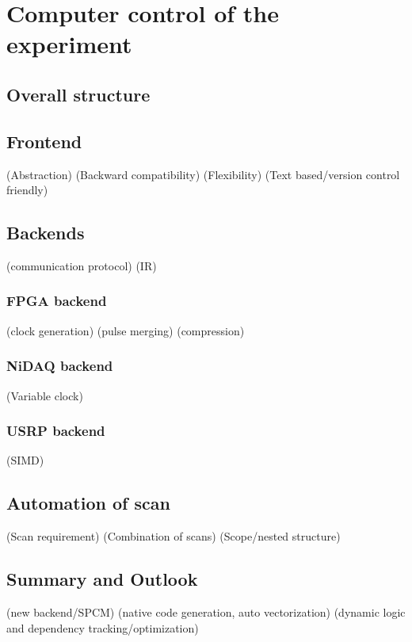 
\chapter{Computer control of the experiment}

\section{Overall structure}

\section{Frontend}
(Abstraction)
(Backward compatibility)
(Flexibility)
(Text based/version control friendly)

\section{Backends}
(communication protocol)
(IR)

\subsection{FPGA backend}
(clock generation)
(pulse merging)
(compression)

\subsection{NiDAQ backend}
(Variable clock)

\subsection{USRP backend}
(SIMD)

\section{Automation of scan}
(Scan requirement)
(Combination of scans)
(Scope/nested structure)

\section{Summary and Outlook}
(new backend/SPCM)
(native code generation, auto vectorization)
(dynamic logic and dependency tracking/optimization)
